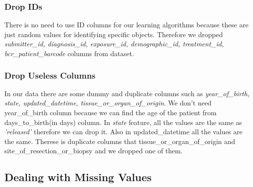 \documentclass[onecolumn]{article}
\begin{document}
\subsubsection{Drop IDs} %
There is no need to use ID columns for our learning algorithms because these are just random values for identifying specific objects. Therefore we dropped \emph{submitter\_id, diagnosis\_id, exposure\_id, demographic\_id, treatment\_id, bcr\_patient\_barcode} columns from dataset.

\subsubsection{Drop Useless Columns}
In our data there are some dummy and duplicate columns such as \emph{year\_of\_birth, state, updated\_datetime, tissue\_or\_organ\_of\_origin}. We don't need year\_of\_birth column because we can find the age of the patient from days\_to\_birth(in days) column. In \emph{state} feature, all the values are the same as \emph{'released'} therefore we can drop it. Also in updated\_datetime all the values are the same. Therese is duplicate columns that tissue\_or\_organ\_of\_origin and site\_of\_resection\_or\_biopsy and we dropped one of them.
\subsection{Dealing with Missing Values}
\end{document}
